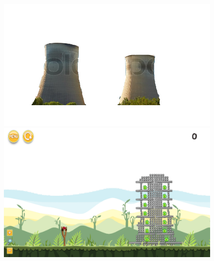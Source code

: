 \documentclass{dalthesis}
\begin{document}
\begin{figure}
  \includegraphics[width=\textwidth,height=\textheight,keepaspectratio]{levels/pictures/mechanisms/chimneys.jpg}
  \includegraphics[width=\textwidth,height=\textheight,keepaspectratio]{levels/screenshots/mechanisms/chimneys.png}
\end{figure}
\end{document}
